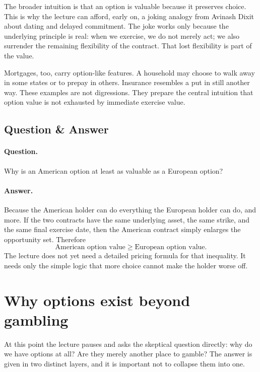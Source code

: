 The broader intuition is that an option is valuable because it preserves choice. This is why the lecture can afford, early on, a joking analogy from Avinash Dixit about dating and delayed commitment. The joke works only because the underlying principle is real: when we exercise, we do not merely act; we also surrender the remaining flexibility of the contract. That lost flexibility is part of the value.

Mortgages, too, carry option-like features. A household may choose to walk away in some states or to prepay in others. Insurance resembles a put in still another way. These examples are not digressions. They prepare the central intuition that option value is not exhausted by immediate exercise value.

\subsection{Question \& Answer}

\paragraph{Question.} Why is an American option at least as valuable as a European option?

\paragraph{Answer.} Because the American holder can do everything the European holder can do, and more. If the two contracts have the same underlying asset, the same strike, and the same final exercise date, then the American contract simply enlarges the opportunity set. Therefore
\begin{equation}
\text{American option value} \ge \text{European option value}.
\end{equation}
The lecture does not yet need a detailed pricing formula for that inequality. It needs only the simple logic that more choice cannot make the holder worse off.

\section{Why options exist beyond gambling}

At this point the lecture pauses and asks the skeptical question directly: why do we have options at all? Are they merely another place to gamble? The answer is given in two distinct layers, and it is important not to collapse them into one.

